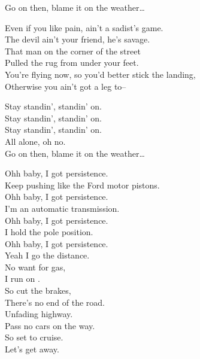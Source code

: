 Go on then, blame it on the weather… \\


Even if you like pain,  ain't a sadist's game. \\
The devil ain't your friend, he's savage. \\
That man on the corner of the street \\
Pulled the rug from under your feet. \\
You're flying now, so you'd better stick the landing, \\
Otherwise you ain't got a leg to-- \\


Stay standin', standin' on. \\
Stay standin', standin' on. \\
Stay standin', standin' on. \\
All alone, oh no. \\

Go on then, blame it on the weather… \\





Ohh baby, I got persistence. \\
Keep pushing like the Ford motor pistons. \\
Ohh baby, I got persistence. \\
I'm an automatic transmission. \\
Ohh baby, I got persistence. \\
I hold the pole position. \\
Ohh baby, I got persistence. \\
Yeah I go the distance. \\

No want for gas, \\
I run on . \\
So cut the brakes, \\
There's no end of the road. \\
Unfading highway. \\
Pass no cars on the way. \\
So set to cruise. \\
Let's get away. \\

